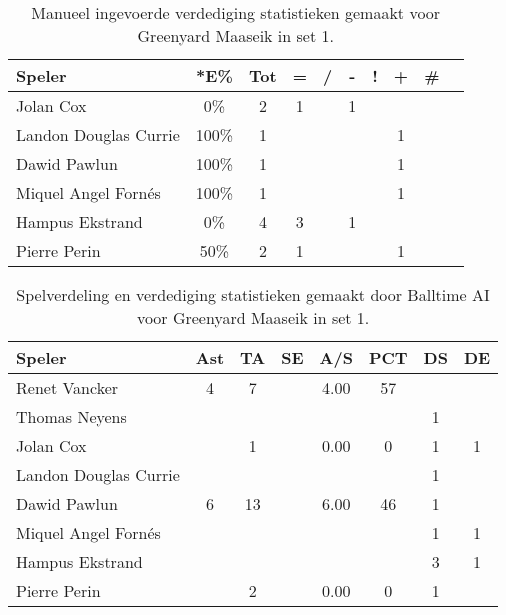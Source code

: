 \begin{table}[ht!]
    \centering
    \scriptsize
    \begin{tabular}{|l|c|c|c|c|c|c|c|c|c|}
        \hline
        \textbf{Speler}  & *E\% & Tot & = & / & - & ! & + & \# \\ \hline
        Jolan Cox & 0\% & 2 & 1 &  & 1 &  &  &  \\ 
        Landon Douglas Currie & 100\% & 1 &  &  &  &  & 1 &  \\ 
        Dawid Pawlun & 100\% & 1 &  &  &  &  & 1 &  \\ 
        Miquel Angel Fornés & 100\% & 1 &  &  &  &  & 1 &  \\ 
        Hampus Ekstrand & 0\% & 4 & 3 &  & 1 &  &  &  \\ 
        Pierre Perin & 50\% & 2 & 1 &  &  &  & 1 &  \\ \hline
    \end{tabular}
    \caption[Manueel ingevoerde verdedigingsstatistieken gemaakt voor Greenyard Maaseik in set 1]{\label{tab:PL1DigMaaseikMan1}Manueel ingevoerde verdediging statistieken gemaakt voor Greenyard Maaseik in set 1.}
\end{table}

\begin{table}[ht!]
  \centering
  \scriptsize
  \begin{tabular}{|l|c|c|c|c|c|c|c|}  \hline
    \textbf{Speler} & Ast & TA & SE & A/S & PCT & DS & DE \\ \hline
    Renet Vancker & 4 & 7 &  & 4.00 & 57 &  &  \\
    Thomas Neyens &  &  &  &  &  & 1 &  \\
    Jolan Cox &  & 1 &  & 0.00 & 0 & 1 & 1 \\
    Landon Douglas Currie &  &  &  &  &  & 1 &  \\
    Dawid Pawlun & 6 & 13 &  & 6.00 & 46 & 1 &  \\
    Miquel Angel Fornés &  &  &  &  &  & 1 & 1 \\
    Hampus Ekstrand &  &  &  &  &  & 3 & 1 \\
    Pierre Perin &  & 2 &  & 0.00 & 0 & 1 &  \\ \hline
  \end{tabular}
  \caption[Spelverdeling- en verdedigingsstatistieken gemaakt door Balltime AI voor Greenyard Maaseik in set 1]{\label{tab:PL1SetDigMaaseikAI1}Spelverdeling en verdediging statistieken gemaakt door Balltime AI voor Greenyard Maaseik in set 1.}
\end{table}

